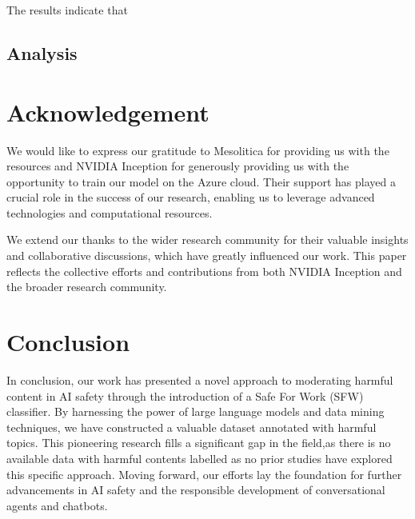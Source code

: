 \documentclass[preprint]{article}
\begin{document}
The results indicate that 

\subsection{Analysis}



\section{Acknowledgement}

We would like to express our gratitude to Mesolitica for providing us with the resources and NVIDIA Inception for generously providing us with the opportunity to train our model on the Azure cloud. Their support has played a crucial role in the success of our research, enabling us to leverage advanced technologies and computational resources.

We extend our thanks to the wider research community for their valuable insights and collaborative discussions, which have greatly influenced our work. This paper reflects the collective efforts and contributions from both NVIDIA Inception and the broader research community.

\section{Conclusion}

In conclusion, our work has presented a novel approach to moderating harmful content in AI safety through the introduction of a Safe For Work (SFW) classifier. By harnessing the power of large language models and data mining techniques, we have constructed a valuable dataset annotated with harmful topics. This pioneering research fills a significant gap in the field,as there is no available data with harmful contents labelled as no prior studies have explored this specific approach. Moving forward, our efforts lay the foundation for further advancements in AI safety and the responsible development of conversational agents and chatbots.

{}

\end{document}
